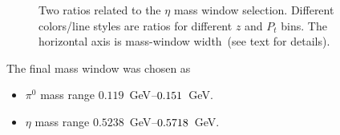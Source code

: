 \begin{figure}[h]
\centering     %
{}
\caption{Two ratios related to  the $\eta$ mass window selection. Different colors/line styles are ratios for different $z$ and $P_t$ bins. The horizontal axis is mass-window width~(see text for details).}
\label{fig:etaS}
\end{figure}
The final mass window was chosen as
\begin{itemize}
\item $\pi^0$ mass range $0.119$~GeV$\textup{--}0.151$~GeV.
\item $\eta$ mass range $0.5238$~GeV$\textup{--}0.5718$~GeV.
\end{itemize}
